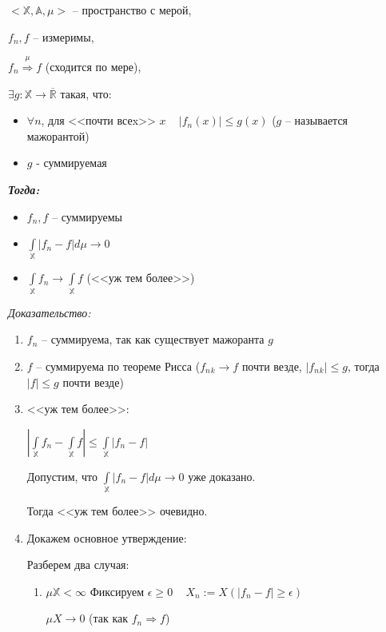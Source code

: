 \documentclass[paper=a4, fontsize=13.2pt]{article}
\begin{document}
\begin{flushleft}

$<\mathds{X}, \mathds{A}, \mu>$ -- пространство с мерой,

$f_n, f$ -- измеримы,

$f_n\stackrel{\mu}{\Rightarrow}f$ (сходится по мере),

$\exists g : \mathds{X} \rightarrow \overline{\mathds{R}}$ такая, что:
\begin{itemize}
\item
$\forall n$,  для <<почти всеx>> $x$ ~ $|f_n(x)| \leq g(x)$ ($g$ -- называется мажорантой)
\item
$g$ - суммируемая
\end{itemize}

\emph{\textbf{Тогда:}}
\begin{itemize}
    \item $f_n, f$ -- суммируемы
    \item $\int\limits_{\mathds{X}} |f_n - f| d\mu \rightarrow 0$
    \item $\int\limits_{\mathds{X}} f_n \rightarrow \int\limits_{\mathds{X}} f$ (<<уж тем более>>)
\end{itemize}

\emph{Доказательство:}

\begin{enumerate}
	\item $f_n$ -- суммируема, так как существует мажоранта $g$
	\item $f$ -- суммируема по теореме Рисса ($ f_n{_k} \rightarrow f $ почти везде, $ |f_n{_k}| \leq g$, тогда $|f| \leq g$ почти везде)
	\item <<уж тем более>>:

	$ |\int\limits_{\mathbb{X}} f_n - \int\limits_{\mathbb{X}} f| \leq \int\limits_{\mathbb{X}} |f_n - f| $

	Допустим, что $\int\limits_{\mathds{X}} |f_n - f| d\mu \rightarrow 0$ уже доказано.

	Тогда <<уж тем более>> очевидно.

	\item Докажем основное утверждение:

	Разберем два случая:
	\begin{enumerate}
		\item $ \mu \mathbb{X} < \infty $
		Фиксируем $ \epsilon \ge 0 $ ~ $ X_n := X(|f_n - f| \geq \epsilon) $

		$ \mu X \rightarrow 0 $ (так как $ f_n \Rightarrow f $)


\end{enumerate}
\end{enumerate}
\end{flushleft}
\end{document}
